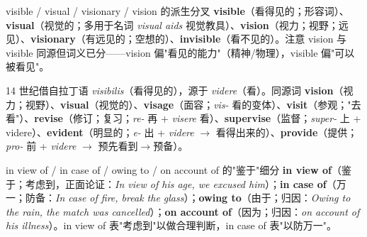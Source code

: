 \documentclass[../main.tex]{subfiles}
\begin{document}


\begin{gram}{visible / visual / visionary / vision 的派生分叉}
\textbf{visible}（看得见的；形容词）、\textbf{visual}（视觉的；多用于名词 \textit{visual aids} 视觉教具）、\textbf{vision}（视力；视野；远见）、\textbf{visionary}（有远见的；空想的）、\textbf{invisible}（看不见的）。注意 vision 与 visible 同源但词义已分——vision 偏"看见的能力"（精神/物理），visible 偏"可以被看见"。
\end{gram}

\begin{origin}
14 世纪借自拉丁语 \textit{visibilis}（看得见的），源于 \textit{videre}（看）。同源词 \textbf{vision}（视力；视野）、\textbf{visual}（视觉的）、\textbf{visage}（面容；\textit{vis-} 看的变体）、\textbf{visit}（参观；"去看"）、\textbf{revise}（修订；复习；\textit{re-} 再 + \textit{visere} 看）、\textbf{supervise}（监督；\textit{super-} 上 + videre）、\textbf{evident}（明显的；\textit{e-} 出 + \textit{videre} $\to$ 看得出来的）、\textbf{provide}（提供；\textit{pro-} 前 + \textit{videre} $\to$ 预先看到$\to$预备）。
\end{origin}



\begin{lex}{in view of / in case of / owing to / on account of 的"鉴于"细分}
\textbf{in view of}（鉴于；考虑到，正面论证：\textit{In view of his age, we excused him}）；\textbf{in case of}（万一；防备：\textit{In case of fire, break the glass}）；\textbf{owing to}（由于；归因：\textit{Owing to the rain, the match was cancelled}）；\textbf{on account of}（因为；归因：\textit{on account of his illness}）。in view of 表"考虑到"以做合理判断，in case of 表"以防万一"。
\end{lex}


\end{document}
